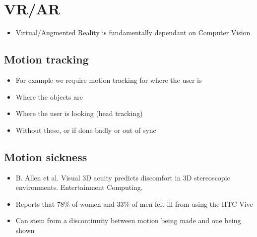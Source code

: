 \documentclass[a4paper]{article}
\begin{document}
\section{VR/AR}
\label{sec-12}
\begin{itemize}
\item Virtual/Augmented Reality is fundamentally dependant on Computer Vision
\end{itemize}
\subsection{Motion tracking}
\label{sec-12-1}
\begin{itemize}
\item For example we require motion tracking for where the user is
\item Where the objects are
\item Where the user is looking (head tracking)
\item Without these, or if done badly or out of sync
\end{itemize}
\subsection{Motion sickness}
\label{sec-12-2}
\begin{itemize}
\item B. Allen et al. Visual 3D acuity predicts discomfort in 3D stereoscopic environments. Entertainment Computing.
\item Reports that 78\% of women and 33\% of men felt ill from using the HTC Vive
\item Can stem from a discontinuity between motion being made and one being shown
\end{itemize}
\end{document}
